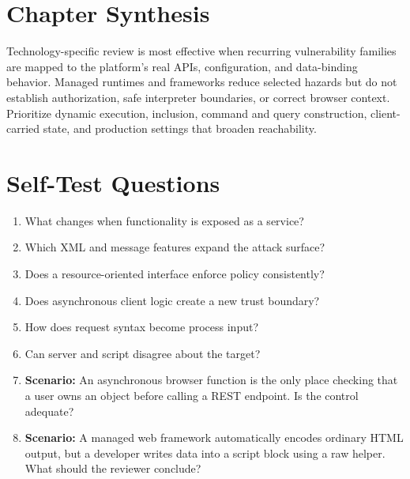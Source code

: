 \documentclass[11pt,letterpaper]{article}
\begin{document}
\section{Chapter Synthesis}
Technology-specific review is most effective when recurring vulnerability families are mapped to the platform's real APIs, configuration, and data-binding behavior. Managed runtimes and frameworks reduce selected hazards but do not establish authorization, safe interpreter boundaries, or correct browser context. Prioritize dynamic execution, inclusion, command and query construction, client-carried state, and production settings that broaden reachability.
\section{Self-Test Questions}
\begin{enumerate}
\item What changes when functionality is exposed as a service?
\item Which XML and message features expand the attack surface?
\item Does a resource-oriented interface enforce policy consistently?
\item Does asynchronous client logic create a new trust boundary?
\item How does request syntax become process input?
\item Can server and script disagree about the target?
\item \textbf{Scenario:} An asynchronous browser function is the only place checking that a user owns an object before calling a REST endpoint. Is the control adequate?
\item \textbf{Scenario:} A managed web framework automatically encodes ordinary HTML output, but a developer writes data into a script block using a raw helper. What should the reviewer conclude?
\end{enumerate}
\clearpage
\end{document}
